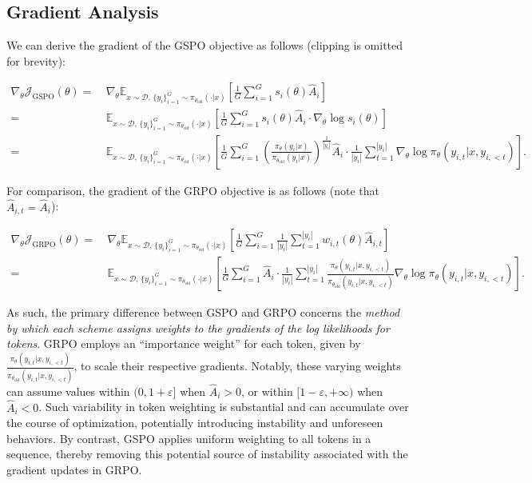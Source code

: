 \subsection{Gradient Analysis}
\label{subsec:gradient}

We can derive the gradient of the GSPO objective as follows (clipping is omitted for brevity):

\begin{align}
\nabla_{\theta} \mathcal{J}_\text{GSPO} (\theta)
=&\ 
\nabla_{\theta} \mathbb{E}_{ x \sim \mathcal{D},\, \{y_i\}_{i=1}^G \sim \pi_{\theta_\text{old}}( \cdot | x) }
\left[ 
\frac{1}{G} \sum_{i=1}^{G} s_{i}(\theta) \widehat{A}_{i}
\right] \\
= &\ 
\mathbb{E}_{ x \sim \mathcal{D},\, \{y_i\}_{i=1}^G \sim \pi_{\theta_\text{old}}( \cdot | x) }
\left[ 
\frac{1}{G} \sum_{i=1}^{G}
s_{i}(\theta) \widehat{A}_{i}
\cdot \nabla_{\theta} \log s_{i}(\theta)
\right] \\
=&\ 
\mathbb{E}_{ x \sim \mathcal{D},\, \{y_i\}_{i=1}^G \sim \pi_{\theta_\text{old}}( \cdot | x) }
\left[ 
\frac{1}{G} \sum_{i=1}^{G} 
\left( \frac{ \pi_{\theta} (y_i | x) }{ \pi_{\theta_\text{old}} (y_i | x)} \right)^{\frac{1}{|y_i|}} \widehat{A}_{i} 
\cdot \frac{1}{|y_i|} \sum_{t=1}^{|y_i|} \nabla_{\theta} \log \pi_{\theta} (y_{i,t} | x, y_{i,<t}) 
\right].
\label{equ:gspo_grad}
\end{align}

For comparison, the gradient of the GRPO objective is as follows (note that $\widehat{A}_{i,t} = \widehat{A}_{i}$):

\begin{align}
\nabla_{\theta} \mathcal{J}_\text{GRPO} (\theta) 
=&\ 
\nabla_{\theta} \mathbb{E}_{ x \sim \mathcal{D},\, \{y_i\}_{i=1}^G \sim \pi_{\theta_\text{old}}( \cdot | x) }
\left[ \frac{1}{G} \sum_{i=1}^{G} \frac{1}{|y_i|} \sum_{t=1}^{|y_i|} 
w_{i,t}(\theta) \widehat{A}_{i,t}
\right] \\
=&\
\mathbb{E}_{ x \sim \mathcal{D},\, \{y_i\}_{i=1}^G \sim \pi_{\theta_\text{old}}( \cdot | x) }
\left[ \frac{1}{G} \sum_{i=1}^{G} \widehat{A}_{i} 
\cdot \frac{1}{|y_i|} \sum_{t=1}^{|y_i|} 
\frac{ \pi_{\theta} (y_{i,t} | x, y_{i,<t}) }{ \pi_{\theta_\text{old}} (y_{i,t} | x,y_{i,<t})} 
\nabla_{\theta} \log \pi_{\theta} (y_{i,t} | x, y_{i,<t})  
\right].
\end{align}

As such, the primary difference between GSPO and GRPO concerns the \textit{method by which each scheme assigns weights to the gradients of the log likelihoods for tokens}. GRPO employs an ``importance weight'' for each token, given by $\frac{ \pi_{\theta} (y_{i,t} | x, y_{i,<t}) }{ \pi_{\theta_\text{old}} (y_{i,t} | x,y_{i,<t})}$, to scale their respective gradients. Notably, these varying weights can assume values within $(0, 1+\varepsilon]$ when $\widehat{A}_{i} >0$, or within $[1-\varepsilon, +\infty)$ when $\widehat{A}_{i} < 0$. Such variability in token weighting is substantial and can accumulate over the course of optimization, potentially introducing instability and unforeseen behaviors. By contrast, GSPO applies uniform weighting to all tokens in a sequence, thereby removing this potential source of instability associated with the gradient updates in GRPO.

